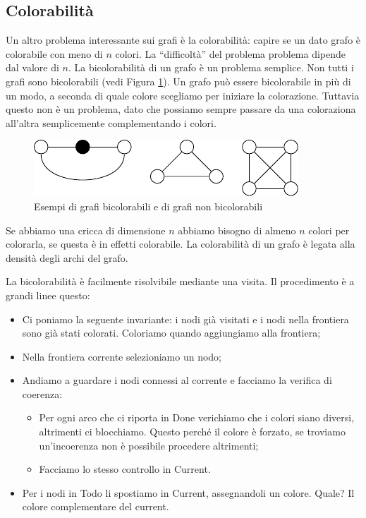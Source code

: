 \subsection{Colorabilità}

Un altro problema interessante sui grafi è la colorabilità: capire se un dato grafo è colorabile con
meno di $n$ colori. La ``difficoltà'' del problema problema dipende dal valore di $n$. La
bicolorabilità di un grafo è un problema semplice. Non tutti i grafi sono bicolorabili (vedi Figura
\ref{TwoColorableGraphs}). Un grafo può essere bicolorabile in più di un modo, a seconda di quale
colore scegliamo per iniziare la colorazione. Tuttavia questo non è un problema, dato che possiamo
sempre passare da una coloraziona all'altra semplicemente complementando i colori.

\begin{figure}[h]
    \begin{center}
        \includegraphics{img/2ColorableGraphs.pdf}
    \end{center}
    \caption{Esempi di grafi bicolorabili e di grafi non bicolorabili}
    \label{TwoColorableGraphs}
\end{figure}

Se abbiamo una cricca di dimensione $n$ abbiamo bisogno di almeno $n$ colori per colorarla, se
questa è in effetti colorabile. La colorabilità di un grafo è legata alla densità degli archi del
grafo.

La bicolorabilità è facilmente risolvibile mediante una visita. Il procedimento è a grandi linee
questo:
\begin{itemize}
    \item Ci poniamo la seguente invariante: i nodi già visitati e i nodi nella frontiera sono già
    stati colorati. Coloriamo quando aggiungiamo alla frontiera;
    \item Nella frontiera corrente selezioniamo un nodo;
    \item Andiamo a guardare i nodi connessi al corrente e facciamo la verifica di coerenza:
    \begin{itemize}
        \item Per ogni arco che ci riporta in Done verichiamo che i colori siano diversi, altrimenti
        ci blocchiamo. Questo perché il colore è forzato, se troviamo un'incoerenza non è
        possibile procedere altrimenti;
        \item Facciamo lo stesso controllo in Current.
    \end{itemize}
    \item Per i nodi in Todo li spostiamo in Current, assegnandoli un colore. Quale? Il colore
    complementare del current.
\end{itemize}

